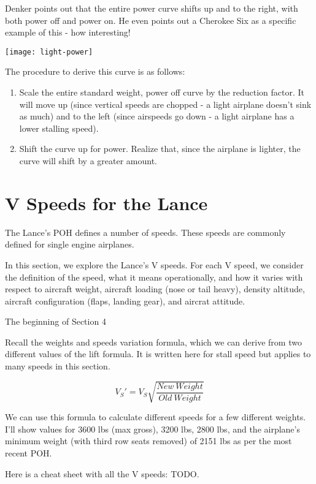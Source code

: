 Denker points out that the entire power curve shifts up and to the right, with both power off and power on. He even points out a Cherokee Six as a specific example of this - how interesting!

\texttt{[image: light-power]}

The procedure to derive this curve is as follows:

\begin{enumerate}
\item Scale the entire standard weight, power off curve by the reduction factor. It will move up (since vertical speeds are chopped - a light airplane doesn't sink as much) and to the left (since airspeeds go down - a light airplane has a lower stalling speed).
\item Shift the curve up for power. Realize that, since the airplane is lighter, the curve will shift by a greater amount.
\end{enumerate}


\section{V Speeds for the Lance}

The Lance's POH defines a number of speeds. These speeds are commonly defined for single engine airplanes.

In this section, we explore the Lance's V speeds. For each V speed, we consider the definition of the speed, what it means operationally, and how it varies with respect to aircraft weight, aircraft loading (nose or tail heavy), density altitude, aircraft configuration (flaps, landing gear), and aircrat attitude.

The beginning of Section 4 

Recall the weights and speeds variation formula, which we can derive from two different values of the lift formula. It is written here for stall speed but applies to many speeds in this section.

\begin{equation}
V_S' = V_S \sqrt{\frac{New\ Weight}{Old\ Weight}}
\end{equation}

We can use this formula to calculate different speeds for a few different weights. I'll show values for 3600 lbs (max gross), 3200 lbs, 2800 lbs, and the airplane's minimum weight (with third row seats removed) of 2151 lbs as per the most recent POH.

Here is a cheat sheet with all the V speeds: TODO.

